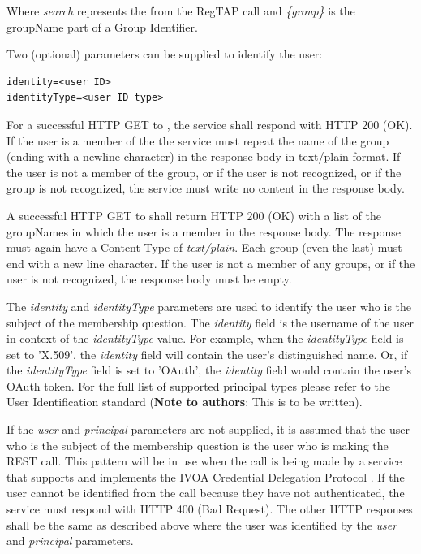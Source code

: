 \documentclass[11pt,a4paper]{ivoa}
\begin{document}
Where \emph{search} represents the  from the RegTAP call and \emph{\{group\}} is the groupName part of a Group Identifier.

Two (optional) parameters can be supplied to identify the user:

\begin{verbatim}
identity=<user ID>
identityType=<user ID type>
\end{verbatim}

For a successful HTTP GET to , the service shall respond with HTTP 200 (OK).  If the user is a member of the  the service must repeat the name of the group (ending with a newline character) in the response body in text/plain format.  If the user is not a member of the group, or if the user is not recognized, or if the group is not recognized, the service must write no content in the response body.

A successful HTTP GET to  shall return HTTP 200 (OK) with a list of the groupNames in which the user is a member in the response body.  The response must again have a Content-Type of \emph {text/plain}.  Each group (even the last) must end with a new line character.  If the user is not a member of any groups, or if the user is not recognized, the response body must be empty.

The \emph{identity} and \emph{identityType} parameters are used to identify the user who is the subject of the membership question.  The \emph{identity} field is the username of the user in context of the \emph{identityType} value.  For example, when the \emph{identityType} field is set to 'X.509', the \emph{identity} field will contain the user's distinguished name.  Or, if the \emph{identityType} field is set to 'OAuth', the \emph{identity} field would contain the user's OAuth token.  For the full list of supported principal types please refer to the User Identification standard (\textbf{Note to authors}: This is to be written).

If the \emph{user} and \emph{principal} parameters are not supplied, it is assumed that the user who is the subject of the membership question is the user who is making the REST call.  This pattern will be in use when the call is being made by a service that supports and implements the IVOA Credential Delegation Protocol \citep{std:CDP}.  If the user cannot be identified from the call because they have not authenticated, the service must respond with HTTP 400 (Bad Request).  The other HTTP responses shall be the same as described above where the user was identified by the \emph{user} and \emph{principal} parameters.
\end{document}
